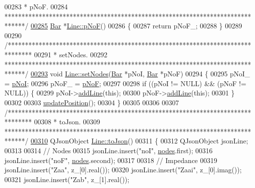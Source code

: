 \begin{DoxyCode}
00283 \textcolor{comment}{ * pNoF.}
00284 \textcolor{comment}{ ******************************************************************************/}
\hypertarget{line_8cpp_source_l00285}{}\hyperlink{group___models_gabbc73ddedd3075c33ae5331bd7c9829f}{00285} \hyperlink{class_bar}{Bar} *\hyperlink{group___models_gabbc73ddedd3075c33ae5331bd7c9829f}{Line::pNoF}()
00286 \{
00287   \textcolor{keywordflow}{return} pNoF\_;
00288 \}
00289 
00290 \textcolor{comment}{/*******************************************************************************}
00291 \textcolor{comment}{ * setNodes.}
00292 \textcolor{comment}{ ******************************************************************************/}
\hypertarget{line_8cpp_source_l00293}{}\hyperlink{group___models_gaeeab146e6c1d7d1a688a2764a9c9a170}{00293} \textcolor{keywordtype}{void} \hyperlink{group___models_gaeeab146e6c1d7d1a688a2764a9c9a170}{Line::setNodes}(\hyperlink{class_bar}{Bar} *pNoI, \hyperlink{class_bar}{Bar} *pNoF)
00294 \{
00295   pNoI\_ = \hyperlink{group___models_gaeafd90e84ac2f8de2a879abe9e53eef3}{pNoI};
00296   pNoF\_ = \hyperlink{group___models_gabbc73ddedd3075c33ae5331bd7c9829f}{pNoF};
00297 
00298   \textcolor{keywordflow}{if} ((pNoI != NULL) && (pNoF != NULL)) \{
00299     pNoI->\hyperlink{group___models_ga8cbd2f62d92e69ce6c8d561b682464b6}{addLine}(\textcolor{keyword}{this});
00300     pNoF->\hyperlink{group___models_ga8cbd2f62d92e69ce6c8d561b682464b6}{addLine}(\textcolor{keyword}{this});
00301   \}
00302 
00303   \hyperlink{group___models_ga8fdb12651d4bc592616d241386b066b3}{updatePosition}();
00304 \}
00305 
00306 
00307 \textcolor{comment}{/*******************************************************************************}
00308 \textcolor{comment}{ * toJson.}
00309 \textcolor{comment}{ ******************************************************************************/}
\hypertarget{line_8cpp_source_l00310}{}\hyperlink{group___models_ga4effa7a96db465ea6e01135d5a010739}{00310} QJsonObject \hyperlink{group___models_ga4effa7a96db465ea6e01135d5a010739}{Line::toJson}()
00311 \{
00312   QJsonObject jsonLine;
00313 
00314   \textcolor{comment}{// Nodes}
00315   jsonLine.insert(\textcolor{stringliteral}{"noI"}, \hyperlink{class_line_afd17c40d656e6a8d677cb22df5f0c70b}{nodes}.first);
00316   jsonLine.insert(\textcolor{stringliteral}{"noF"}, \hyperlink{class_line_afd17c40d656e6a8d677cb22df5f0c70b}{nodes}.second);
00317 
00318   \textcolor{comment}{// Impedance}
00319   jsonLine.insert(\textcolor{stringliteral}{"Zaa"}, z\_[0].real());
00320   jsonLine.insert(\textcolor{stringliteral}{"Zaai"}, z\_[0].imag());
00321   jsonLine.insert(\textcolor{stringliteral}{"Zab"}, z\_[1].real());

\end{DoxyCode}
